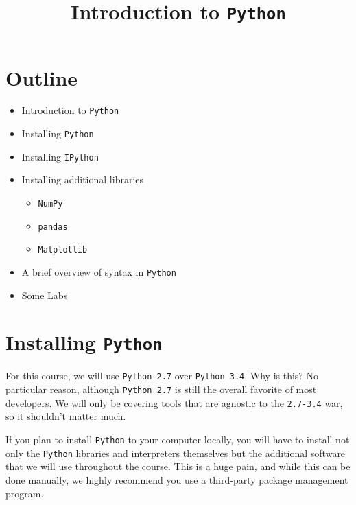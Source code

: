 \documentclass{article}
\title{Introduction to \texttt{Python}}
\begin{document}
    
    
    \maketitle
    
    

    
    \section{Outline}\label{outline}

    \begin{itemize}
\itemsep1pt\parskip0pt
\item
  Introduction to \texttt{Python}
\item
  Installing \texttt{Python}
\item
  Installing \texttt{IPython}
\item
  Installing additional libraries

  \begin{itemize}
  \itemsep1pt\parskip0pt
  \item
    \texttt{NumPy}
  \item
    \texttt{pandas}
  \item
    \texttt{Matplotlib}
  \end{itemize}
\item
  A brief overview of syntax in \texttt{Python}
\item
  Some Labs
\end{itemize}

    \section{Installing \texttt{Python}}\label{installing-python}

For this course, we will use \texttt{Python 2.7} over
\texttt{Python 3.4}. Why is this? No particular reason, although
\texttt{Python 2.7} is still the overall favorite of most developers. We
will only be covering tools that are agnostic to the \texttt{2.7-3.4}
war, so it shouldn't matter much.

If you plan to install \texttt{Python} to your computer locally, you
will have to install not only the \texttt{Python} libraries and
interpreters themselves but the additional software that we will use
throughout the course. This is a huge pain, and while this can be done
manually, we highly recommend you use a third-party package management
program.
\end{document}
